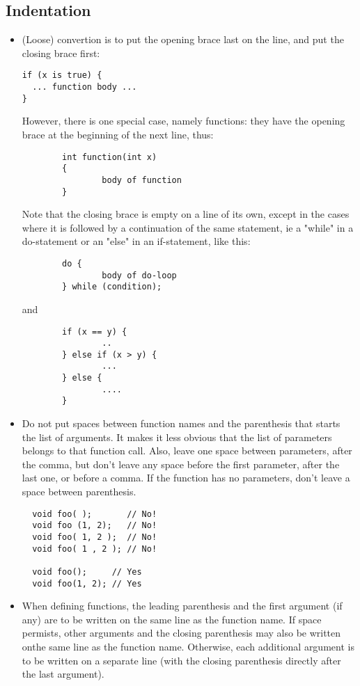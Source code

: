 \documentclass[10pt,letter,relax]{SANDreport}
\begin{document}
\subsection{Indentation}

\begin{itemize}
\item (Loose) convertion is to put the opening
brace last on the line, and put the closing brace first:
\begin{verbatim}
if (x is true) {
  ... function body ...
}
\end{verbatim}
However, there is one special case, namely functions: they have the
opening brace at the beginning of the next line, thus:
\begin{verbatim}
        int function(int x)
        {
                body of function
        }
\end{verbatim}

Note that the closing brace is empty on a line of its own, except in
the cases where it is followed by a continuation of the same statement,
ie a "while" in a do-statement or an "else" in an if-statement, like
this:
\begin{verbatim}
        do {
                body of do-loop
        } while (condition);
\end{verbatim}
and
\begin{verbatim}
        if (x == y) {
                ..
        } else if (x > y) {
                ...
        } else {
                ....
        }
\end{verbatim}
\item Do not put spaces between function names and the parenthesis that
  starts the list of arguments. It makes it less obvious that the list
  of parameters belongs to that function call. Also, leave one space
  between parameters, after the comma, but don't leave any space before
  the first parameter, after the last one, or before a comma. If the
  function has no parameters, don't leave a space between parenthesis.
  \begin{verbatim}
  void foo( );       // No!
  void foo (1, 2);   // No!
  void foo( 1, 2 );  // No!
  void foo( 1 , 2 ); // No!

  void foo();     // Yes
  void foo(1, 2); // Yes
  \end{verbatim}

\item When defining functions, the leading parenthesis and the first argument
  (if any) are to be written on the same line as the function name. If space
  permists, other arguments and the closing parenthesis may also be written
  onthe same line as the function name. Otherwise, each additional argument is
  to be written on a separate line (with the closing parenthesis directly
                                    after the last argument).


\end{itemize}
\end{document}
